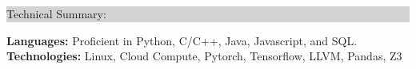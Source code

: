 \documentclass{article} %
\newcommand{\rsection}[1]{
  \hspace{-0.4cm}\vspace{0.1cm}
\colorbox{lightgrey}{
\begin{minipage}{1.07\linewidth}
\vspace{0.22cm}
\fontsize{14pt}{16pt}\selectfont #1
\vspace{0.12cm}
\end{minipage}
}
\vspace*{-0.1cm}
}
\newcommand{\rjob}[2]{
  \hspace*{-0.3cm}
{\fontsize{10pt}{12pt}\selectfont #1} \hfill #2
\vspace*{0.1cm}
\hspace*{-1.2cm}
}
\newenvironment{ritemize}{
\hspace*{-0.8cm}
\begin{minipage}{1.05\linewidth}
\begin{itemize}
}{
\end{itemize}
\end{minipage}
}
\newcommand{\ritem}{
\item[-]
}
\begin{document}





\rsection{Technical Summary:}

\hspace*{-0.3cm}
\textbf{Languages:} Proficient in Python, C/C++, Java, Javascript, and SQL. \\
\hspace*{-0.3cm}
\textbf{Technologies:} Linux, Cloud Compute, Pytorch, Tensorflow, LLVM, Pandas, Z3
\end{document}
